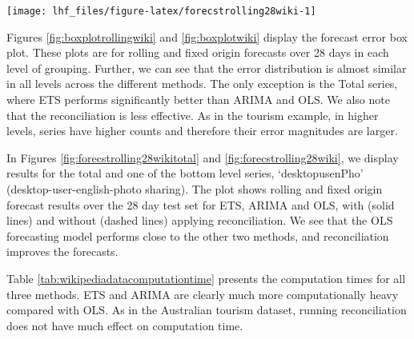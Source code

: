 \documentclass[11pt,a4paper,]{article}
\let\origfigure\figure
\let\endorigfigure\endfigure
\renewenvironment{figure}[1][2] {
    \expandafter\origfigure\expandafter[!htbp]
} {
    \endorigfigure
}
\begin{document}
\begin{figure}

{\centering \texttt{[image: lhf\_files/figure-latex/forecstrolling28wiki-1]} 

}

\caption{The actual test set for the 'desktopusenPho04' bottom level series compared to the forecasts from reconciled and unreconciled ETS, ARIMA and OLS methods for rolling and fixed origin forecasts of Wikipedia pageviews.}\label{fig:forecstrolling28wiki}
\end{figure}

Figures \ref{fig:boxplotrollingwiki} and \ref{fig:boxplotwiki} display
the forecast error box plot. These plots are for rolling and fixed
origin forecasts over 28 days in each level of grouping. Further, we can
see that the error distribution is almost similar in all levels across
the different methods. The only exception is the Total series, where ETS
performs significantly better than ARIMA and OLS. We also note that the
reconciliation is less effective. As in the tourism example, in higher
levels, series have higher counts and therefore their error magnitudes
are larger.

In Figures \ref{fig:forecstrolling28wikitotal} and
\ref{fig:forecstrolling28wiki}, we display results for the total and one
of the bottom level series, `desktopusenPho' (desktop-user-english-photo
sharing). The plot shows rolling and fixed origin forecast results over
the 28 day test set for ETS, ARIMA and OLS, with (solid lines) and
without (dashed lines) applying reconciliation. We see that the OLS
forecasting model performs close to the other two methods, and
reconciliation improves the forecasts.

Table \ref{tab:wikipediadatacomputationtime} presents the computation
times for all three methods. ETS and ARIMA are clearly much more
computationally heavy compared with OLS. As in the Australian tourism
dataset, running reconciliation does not have much effect on computation
time.
\end{document}
